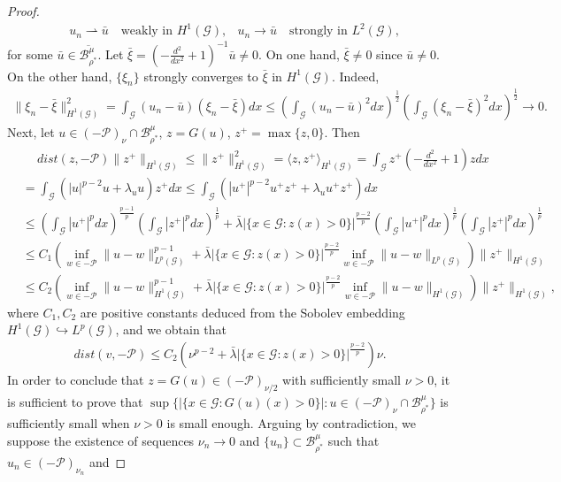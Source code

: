 \documentclass[10pt,a4paper]{article}
\theoremstyle{definition} \theoremstyle{remark}
\numberwithin{equation}{section}
\newcommand{\G}{\mathcal{G}}
\newcommand{\B}{\mathcal{B}}
\newcommand{\p}{\mathcal{P}}
\newcommand{\la}{\lambda}
\begin{document}
\begin{proof}
	\begin{align*}
		& u_n \rightharpoonup \bar u \quad \text{weakly in } H^1(\G), 
		& u_n \to \bar u \quad \text{strongly in } L^2(\G),
	\end{align*}
    for some $\bar u \in \overline{\B_{\rho^*}^\mu}$. Let $\bar \xi = (-\frac{d^2}{dx^2} + 1)^{-1}\bar u \neq 0$. On one hand, $\bar \xi \neq 0$ since $\bar u \neq 0$. On the other hand, $\{\xi_n\}$ strongly converges to $\bar \xi$ in $H^1(\G)$. Indeed,
    \begin{align} \label{eqconvergenceofxi}
    	\|\xi_n - \bar \xi\|_{H^1(\G)}^2 = \int_\G (u_n-\bar u)(\xi_n - \bar \xi)dx \leq \left( \int_\G(u_n-\bar u)^2dx\right) ^{\frac12}\left( \int_\G(\xi_n - \bar \xi)^2dx\right) ^{\frac12} \to 0.
    \end{align}
     Next, let $u \in (-\p)_\nu \cap \B_{\rho^*}^\mu$, $z = G(u)$, $z^+ = \max\{z,0\}$. Then
	\begin{align*}
		& \quad \ dist(z,-\mathcal{P}) \|z^+\|_{H^1(\G)} \leq \|z^+\|_{H^1(\G)}^2 = \langle z,z^+\rangle_{H^1(\G)} = \int_\G  z^+ ( -\frac{d^2}{dx^2} + 1) zdx\\
		& =  \int_\G (|u|^{p-2}u + \la_uu)z^+dx \leq \int_\G (|u^+|^{p-2}u^+z^+ + \la_uu^+z^+)dx \\ 
		& \leq \left( \int_\G|u^+|^pdx\right)^{\frac{p-1}p} \left( \int_\G|z^+|^pdx\right)^{\frac1p} + \bar \la |\{x \in \G: z(x) > 0\}|^{\frac{p-2}{p}} \left( \int_\G|u^+|^pdx\right) ^{\frac1p} \left( \int_\G|z^+|^pdx\right)^{\frac1p} \\
		& \leq C_1\left( \inf_{w \in -\p}\|u-w\|_{L^p(\G)}^{p-1} + \bar \la |\{x \in \G: z(x) > 0\}|^{\frac{p-2}{p}}\inf_{w \in -\p}\|u-w\|_{L^p(\G)}\right) \|z^+\|_{H^1(\G)} \\
		& \le C_2 \left( \inf_{w \in -\p}\|u-w\|_{H^1(\G)}^{p-1} +  \bar \la |\{x \in \G: z(x) > 0\}|^{\frac{p-2}{p}}\inf_{w \in -\p}\|u-w\|_{H^1(\G)}\right) \|z^+\|_{H^1(\G)},
	\end{align*}
    where $C_1,C_2$ are positive constants deduced from the Sobolev embedding $H^1(\G) \hookrightarrow L^p(\G)$, and we obtain that
    \begin{align} \label{eqdistofvandp}
    	dist(v,-\mathcal{P}) \leq C_2\left(\nu^{p-2} + \bar \la |\{x \in \G: z(x) > 0\}|^{\frac{p-2}{p}}\right) \nu.
    \end{align}
    In order to conclude that $z = G(u) \in (-\p)_{\nu/2}$ with sufficiently small $\nu > 0$, it is sufficient to prove that $\sup\{|\{x \in \G: G(u)(x) > 0\}|: u \in (-\p)_\nu \cap \B_{\rho^*}^\mu\}$ is sufficiently small when $\nu > 0$ is small enough. Arguing by contradiction, we suppose the existence of sequences $\nu_n \to 0$ and  $\{u_n\} \subset \B_{\rho^*}^\mu$ such that $u_n \in (-\p)_{\nu_n}$ and 

\end{proof}
\end{document}
